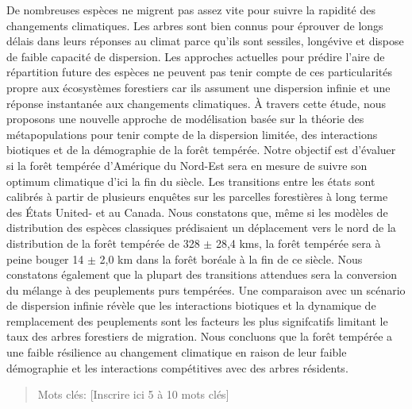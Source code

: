 
\resume
\begin{singlespace}

  De nombreuses espèces ne migrent pas assez vite pour suivre la rapidité des changements climatiques. Les arbres sont bien connus pour éprouver de longs délais dans leurs réponses au climat parce qu'ils sont sessiles, longévive et dispose de faible capacité de dispersion. Les approches actuelles pour prédire l'aire de répartition future des espèces ne peuvent pas tenir compte de ces particularités propre aux écosystèmes forestiers car ils assument une dispersion infinie et une réponse instantanée aux changements climatiques. À travers cette étude, nous proposons une nouvelle approche de modélisation basée sur la théorie des métapopulations pour tenir compte de la dispersion limitée, des interactions biotiques et de la démographie de la forêt tempérée. Notre objectif est d'évaluer si la forêt tempérée d'Amérique du Nord-Est sera en mesure de suivre son optimum climatique d'ici la fin du siècle. Les transitions entre les états sont calibrés à partir de plusieurs enquêtes sur les parcelles forestières à long terme des États United- et au Canada. Nous constatons que, même si les modèles de distribution des espèces classiques prédisaient un déplacement vers le nord de la distribution de la forêt tempérée de 328 $ \pm $ 28,4 kms, la forêt tempérée sera à peine bouger 14 $\pm $ 2,0 km dans la forêt boréale à la fin de ce siècle. Nous constatons également que la plupart des transitions attendues sera la conversion du mélange à des peuplements purs tempérées. Une comparaison avec un scénario de dispersion infinie révèle que les interactions biotiques et la dynamique de remplacement des peuplements sont les facteurs les plus signifcatifs limitant le taux des arbres forestiers de migration. Nous concluons que la forêt tempérée a une faible résilience au changement climatique en raison de leur faible démographie et les interactions compétitives avec des arbres résidents.

  \begin{quote}
    Mots clés: [Inscrire ici 5 à 10 mots clés]
  \end{quote}
\end{singlespace}
\cleardoublepage


